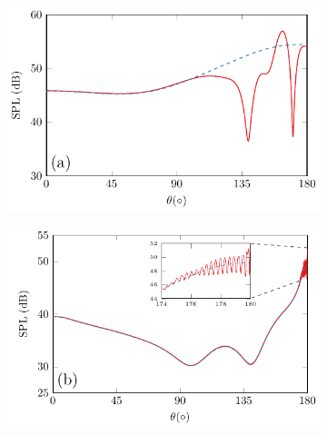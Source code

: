 \begin{figure}[!htb]
    \centering
    \begin{subfigure}{0.49\textwidth}
        \centering
        \includegraphics[width = \textwidth]{fig/PalSphereAudio_211205D_TestTheta1D_Compare_r10cm_500Hz_211206G.pdf}
    \end{subfigure}
    \begin{subfigure}{0.49\textwidth}
        \centering
        \includegraphics[width = \textwidth]{fig/PalSphereAudio_211205D_TestTheta1D_Compare_r100cm_500Hz_211206D.pdf}
    \end{subfigure}
    \\
    \begin{subfigure}{0.49\textwidth}

\end{subfigure}
\end{figure}
